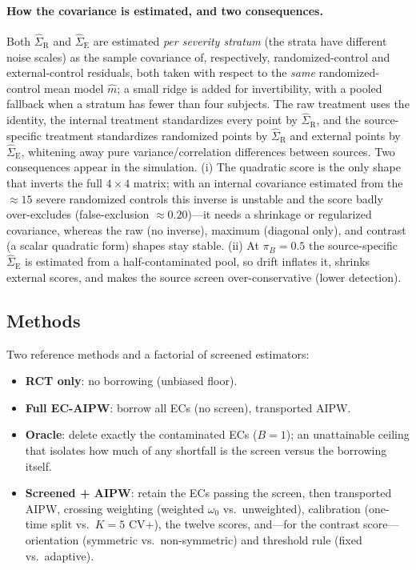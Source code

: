 \documentclass[11pt]{article}
\newcommand{\R}{\mathrm{R}}
\newcommand{\E}{\mathrm{E}}
\begin{document}
\paragraph{How the covariance is estimated, and two consequences.}
Both $\widehat\Sigma_{\R}$ and $\widehat\Sigma_{\E}$ are estimated \emph{per severity stratum} (the strata have different noise scales) as the sample covariance of, respectively, randomized-control and external-control residuals, both taken with respect to the \emph{same} randomized-control mean model $\widehat m$; a small ridge is added for invertibility, with a pooled fallback when a stratum has fewer than four subjects. The raw treatment uses the identity, the internal treatment standardizes every point by $\widehat\Sigma_{\R}$, and the source-specific treatment standardizes randomized points by $\widehat\Sigma_{\R}$ and external points by $\widehat\Sigma_{\E}$, whitening away pure variance/correlation differences between sources. Two consequences appear in the simulation. (i) The quadratic score is the only shape that inverts the full $4\times4$ matrix; with an internal covariance estimated from the $\approx15$ severe randomized controls this inverse is unstable and the score badly over-excludes (false-exclusion $\approx0.20$)---it needs a shrinkage or regularized covariance, whereas the raw (no inverse), maximum (diagonal only), and contrast (a scalar quadratic form) shapes stay stable. (ii) At $\pi_B=0.5$ the source-specific $\widehat\Sigma_{\E}$ is estimated from a half-contaminated pool, so drift inflates it, shrinks external scores, and makes the source screen over-conservative (lower detection).

\subsection{Methods}

Two reference methods and a factorial of screened estimators:
\begin{itemize}
    \item \textbf{RCT only}: no borrowing (unbiased floor).
    \item \textbf{Full EC-AIPW}: borrow all ECs (no screen), transported AIPW.
    \item \textbf{Oracle}: delete exactly the contaminated ECs ($B{=}1$); an unattainable ceiling that isolates how much of any shortfall is the screen versus the borrowing itself.
    \item \textbf{Screened + AIPW}: retain the ECs passing the screen, then transported AIPW, crossing weighting (weighted $\omega_0$ vs.\ unweighted), calibration (one-time split vs.\ $K=5$ CV+), the twelve scores, and---for the contrast score---orientation (symmetric vs.\ non-symmetric) and threshold rule (fixed vs.\ adaptive).
\end{itemize}
\end{document}
